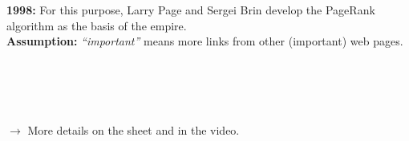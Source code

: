 {\begin{frame}
\begin{minipage}[c]{0.99\textwidth}
			\textbf{1998:} For this purpose, Larry Page and Sergei Brin develop the PageRank algorithm as the basis of the 
			 empire.\\ 
			
			\textbf{Assumption:} \textit{``important''} means more links from other (important) web pages.\\
		\end{minipage}
	~\\~\\~\\~\\
	\color{orange}
	$\rightarrow$ More details on the sheet and in the video.
	\end{frame}

}

